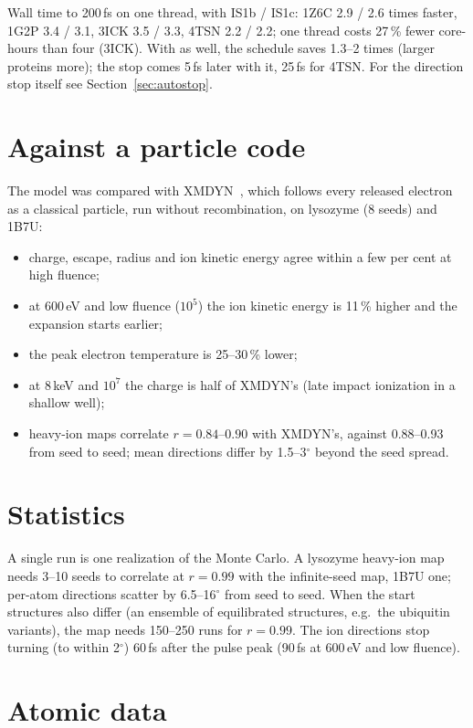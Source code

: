 Wall time to 200\,fs on one thread, with IS1b / IS1c: 1Z6C 2.9 / 2.6 times faster, 1G2P 3.4 / 3.1, 3ICK 3.5 / 3.3,
4TSN 2.2 / 2.2; one thread costs 27\,\% fewer core-hours than four (3ICK).
With  as well, the schedule saves 1.3--2 times (larger proteins more); the stop comes 5\,fs
later with it, 25\,fs for 4TSN.
For the direction stop itself see Section~\ref{sec:autostop}.

\section{Against a particle code}

The model was compared with XMDYN~\cite{jurek2016}, which follows every released electron as a classical particle,
run without recombination, on lysozyme (8 seeds) and 1B7U:
\begin{itemize}
  \item charge, escape, radius and ion kinetic energy agree within a few per cent at high fluence;
  \item at 600\,eV and low fluence ($10^5$) the ion kinetic energy is 11\,\% higher and the expansion starts earlier;
  \item the peak electron temperature is 25--30\,\% lower;
  \item at 8\,keV and $10^7$ the charge is half of XMDYN's (late impact ionization in a shallow well);
  \item heavy-ion maps correlate $r = 0.84$--$0.90$ with XMDYN's, against 0.88--0.93 from seed to seed; mean directions
    differ by 1.5--3$^\circ$ beyond the seed spread.
\end{itemize}

\section{Statistics}

A single run is one realization of the Monte Carlo.
A lysozyme heavy-ion map needs 3--10 seeds to correlate at $r = 0.99$ with the infinite-seed map, 1B7U one; per-atom
directions scatter by 6.5--16$^\circ$ from seed to seed.
When the start structures also differ (an ensemble of equilibrated structures, e.g.\ the ubiquitin variants), the map
needs 150--250 runs for $r = 0.99$.
The ion directions stop turning (to within 2$^\circ$) 60\,fs after the pulse peak (90\,fs at 600\,eV and low fluence).

\section{Atomic data}

